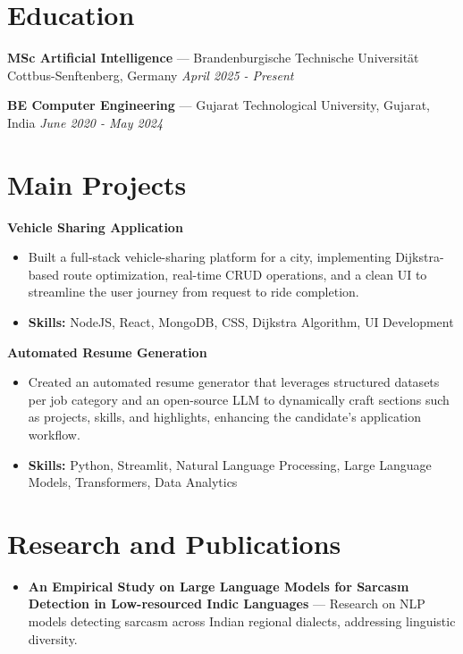 \documentclass[a4paper,10pt]{article}
\begin{document}
\section*{Education}
\textbf{MSc Artificial Intelligence} — Brandenburgische Technische Universität Cottbus-Senftenberg, Germany \hfill \textit{April 2025 - Present}\par
\vspace{1.5pt}
\textbf{BE Computer Engineering} — Gujarat Technological University, Gujarat, India \hfill \textit{June 2020 - May 2024}\par

\section*{Main Projects}
\textbf{Vehicle Sharing Application}\par
\vspace{1pt}
\begin{itemize}
  \item Built a full-stack vehicle-sharing platform for a city, implementing Dijkstra-based route optimization, real-time CRUD operations, and a clean UI to streamline the user journey from request to ride completion.
  \item \textbf{Skills:} NodeJS, React, MongoDB, CSS, Dijkstra Algorithm, UI Development
\end{itemize}
\vspace{3pt}
\textbf{Automated Resume Generation}\par
\vspace{1pt}
\begin{itemize}
  \item Created an automated resume generator that leverages structured datasets per job category and an open-source LLM to dynamically craft sections such as projects, skills, and highlights, enhancing the candidate's application workflow.
  \item \textbf{Skills:} Python, Streamlit, Natural Language Processing, Large Language Models, Transformers, Data Analytics
\end{itemize}

\section*{Research and Publications}
\begin{itemize}
\item \textbf{An Empirical Study on Large Language Models for Sarcasm Detection in Low-resourced Indic Languages} — Research on NLP models detecting sarcasm across Indian regional dialects, addressing linguistic diversity.
\end{itemize}
\end{document}

